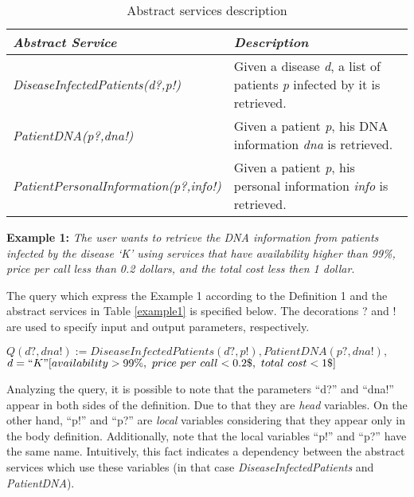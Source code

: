 \documentclass[12pt,a4paper,oneside]{article}
\begin{document}
\begin{table}[h]
\center
\begin{tabular}{|p{7cm}|p{7cm}|}
\hline 
\textbf{\textit{Abstract Service}} & \textbf{\textit{Description}} \\ 
\hline 
\textit{DiseaseInfectedPatients(d?,p!)} & Given a disease \textit{d}, a list of patients \textit{p} infected by it is retrieved. \\ 
\hline 
\textit{PatientDNA(p?,dna!)} & Given a patient \textit{p}, his DNA information \textit{dna} is retrieved. \\ 
\hline 
\textit{PatientPersonalInformation(p?,info!)} & Given a patient \textit{p}, his personal information \textit{info} is retrieved. \\ 
\hline 
\end{tabular} \caption{Abstract services description}
\end{table}\label{example1}


\noindent \textbf{Example 1:} %
\textit{The user wants to retrieve the DNA information from patients infected by the disease `K' using services that have availability higher than 99\%, price per call less than 0.2 dollars, and the total cost less then 1 dollar}.

The query which express the Example 1 according to the Definition 1 and the abstract services in Table \ref{example1} is specified below.
The decorations ? and ! are used to specify input and output parameters, respectively. 

\begin{center}
$Q (d?, dna!) := DiseaseInfectedPatients(d?, p!), PatientDNA(p?, dna!),$ \\
$d = ``K"[availability > 99\%, \ price \ per \ call < 0.2\$, \ total \ cost < 1\$]$
\end{center}  

Analyzing the query, it is possible to note that the parameters ``d?'' and ``dna!'' appear in both sides of the definition.
Due to that they are \textit{head} variables.
On the other hand, ``p!'' and ``p?'' are \textit{local} variables considering that they appear only in the body definition. 
Additionally, note that the local variables ``p!'' and ``p?'' have the same name.
Intuitively, this fact indicates a dependency between the abstract services which use these variables (in that case \textit{DiseaseInfectedPatients} and \textit{PatientDNA}).
\end{document}
